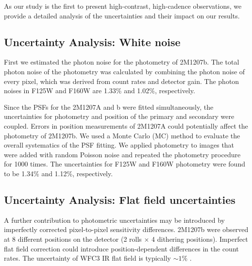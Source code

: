 \documentclass[apj]{emulateapj}
\begin{document}



As our study is the first to present high-contrast, high-cadence
observations, we provide a detailed analysis of the uncertainties and
their impact on our results.

\subsection{Uncertainty Analysis: White noise}

First we estimated the photon noise for the photometry of
2M1207b. The total photon noise of the photometry was calculated by
combining the photon noise of every pixel, which was derived
from count rates and detector gain. The photon noises 
in F125W and F160W are 1.33\% and 1.02\%, respectively.

Since the PSFs for the 2M1207A and b were fitted simultaneously, the
uncertainties for photometry and position of the primary and secondary
were coupled. Errors in position measurements of 2M1207A could
potentially affect the photometry of 2M1207b. We used a Monte Carlo
(MC) method to evaluate the overall systematics of the PSF fitting. We
applied photometry to images that were added with random
Poisson noise and repeated the photometry procedure for 1000 times. The
uncertainties for F125W and F160W photometry were found to be 1.34\% and 1.12\%,
respectively. 

\subsection{Uncertainty Analysis: Flat field uncertainties}


A further contribution to photometric uncertainties may be introduced
by imperfectly corrected pixel-to-pixel sensitivity
differences. 2M1207b were observed at 8 different positions on the
detector (2 rolls $\times$ 4 dithering positions). Imperfect flat
field correction could introduce position-dependent
differences in the count rates. The uncertainty of WFC3 IR flat field
is typically $\sim 1\%$ \citep{dressel2012wide}.
\end{document}
